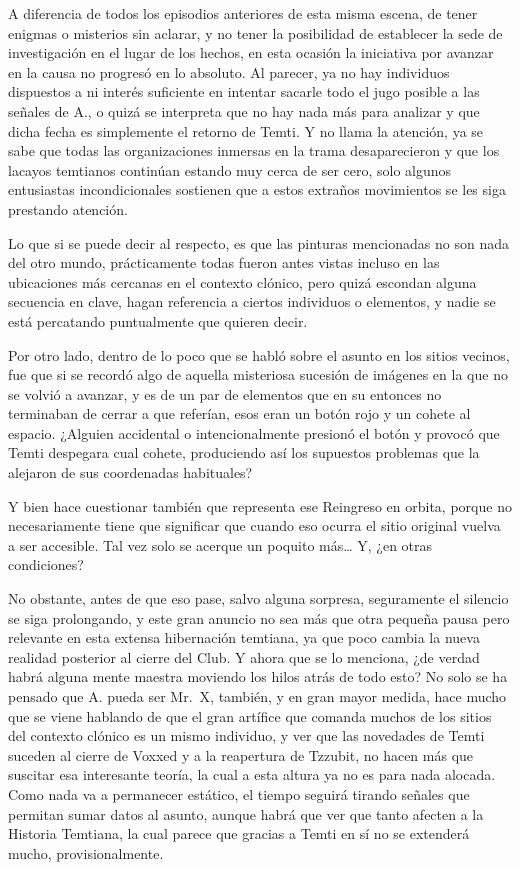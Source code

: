 \documentclass[
  spanish,
]{book}
\begin{document}
A diferencia de todos los episodios anteriores de esta misma escena, de tener enigmas o misterios sin aclarar, y no tener la posibilidad de establecer la sede de investigación en el lugar de los hechos, en esta ocasión la iniciativa por avanzar en la causa no progresó en lo absoluto. Al parecer, ya no hay individuos dispuestos a ni interés suficiente en intentar sacarle todo el jugo posible a las señales de A., o quizá se interpreta que no hay nada más para analizar y que dicha fecha es simplemente el retorno de Temti. Y no llama la atención, ya se sabe que todas las organizaciones inmersas en la trama desaparecieron y que los lacayos temtianos continúan estando muy cerca de ser cero, solo algunos entusiastas incondicionales sostienen que a estos extraños movimientos se les siga prestando atención.

Lo que si se puede decir al respecto, es que las pinturas mencionadas no son nada del otro mundo, prácticamente todas fueron antes vistas incluso en las ubicaciones más cercanas en el contexto clónico, pero quizá escondan alguna secuencia en clave, hagan referencia a ciertos individuos o elementos, y nadie se está percatando puntualmente que quieren decir.

Por otro lado, dentro de lo poco que se habló sobre el asunto en los sitios vecinos, fue que si se recordó algo de aquella misteriosa sucesión de imágenes en la que no se volvió a avanzar, y es de un par de elementos que en su entonces no terminaban de cerrar a que referían, esos eran un botón rojo y un cohete al espacio. ¿Alguien accidental o intencionalmente presionó el botón y provocó que Temti despegara cual cohete, produciendo así los supuestos problemas que la alejaron de sus coordenadas habituales?

Y bien hace cuestionar también que representa ese Reingreso en orbita, porque no necesariamente tiene que significar que cuando eso ocurra el sitio original vuelva a ser accesible. Tal vez solo se acerque un poquito más\ldots{} Y, ¿en otras condiciones?

No obstante, antes de que eso pase, salvo alguna sorpresa, seguramente el silencio se siga prolongando, y este gran anuncio no sea más que otra pequeña pausa pero relevante en esta extensa hibernación temtiana, ya que poco cambia la nueva realidad posterior al cierre del Club. Y ahora que se lo menciona, ¿de verdad habrá alguna mente maestra moviendo los hilos atrás de todo esto? No solo se ha pensado que A. pueda ser Mr.~X, también, y en gran mayor medida, hace mucho que se viene hablando de que el gran artífice que comanda muchos de los sitios del contexto clónico es un mismo individuo, y ver que las novedades de Temti suceden al cierre de Voxxed y a la reapertura de Tzzubit, no hacen más que suscitar esa interesante teoría, la cual a esta altura ya no es para nada alocada. Como nada va a permanecer estático, el tiempo seguirá tirando señales que permitan sumar datos al asunto, aunque habrá que ver que tanto afecten a la Historia Temtiana, la cual parece que gracias a Temti en sí no se extenderá mucho, provisionalmente.
\end{document}
